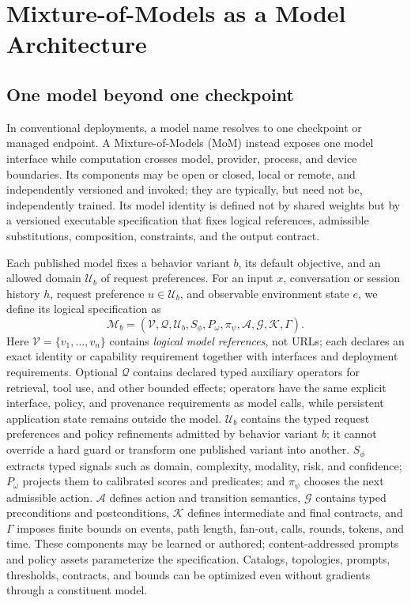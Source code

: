 \section{Mixture-of-Models as a Model Architecture}
\label{sec:formalism}

\subsection{One model beyond one checkpoint}

In conventional deployments, a model name resolves to one checkpoint or managed
endpoint. A Mixture-of-Models (MoM) instead exposes one model interface while
computation crosses model, provider, process, and device boundaries. Its
components may be open or closed, local or remote, and independently versioned
and invoked; they are typically, but need not be, independently trained.
Its model identity is defined not by shared weights but by a versioned
executable specification that fixes logical references, admissible
substitutions, composition, constraints, and the output contract.

Each published model fixes a behavior variant $b$, its default objective, and
an allowed domain $\mathcal{U}_b$ of request preferences. For an input $x$,
conversation or session history $h$, request preference $u\in\mathcal{U}_b$,
and observable environment state $e$, we define its logical specification as
\begin{equation}
  \mathcal{M}_b =
  (\mathcal{V}, \mathcal{Q}, \mathcal{U}_b, S_{\phi}, P_{\omega}, \pi_{\psi},
   \mathcal{A}, \mathcal{G}, \mathcal{K}, \Gamma).
  \label{eq:mom-object}
\end{equation}
Here $\mathcal{V}=\{v_1,\ldots,v_n\}$ contains \emph{logical model references},
not URLs; each declares an exact identity or capability requirement together
with interfaces and deployment requirements. Optional $\mathcal{Q}$ contains
declared typed auxiliary operators for retrieval, tool use, and other bounded
effects; operators have the same explicit interface, policy, and provenance
requirements as model calls, while persistent application state remains
outside the model. $\mathcal{U}_b$ contains the typed request preferences and
policy refinements admitted by behavior variant $b$; it cannot override a hard
guard or transform one published variant into another.
$S_{\phi}$ extracts typed signals such as domain, complexity, modality, risk,
and confidence; $P_{\omega}$ projects them to calibrated scores and predicates;
and $\pi_{\psi}$ chooses the next admissible action. $\mathcal{A}$ defines
action and transition semantics, $\mathcal{G}$ contains typed preconditions and
postconditions, $\mathcal{K}$ defines intermediate and final contracts, and
$\Gamma$ imposes finite bounds on events, path length, fan-out, calls, rounds,
tokens, and time. These components may be learned or authored; content-addressed
prompts and policy assets parameterize the specification. Catalogs, topologies,
prompts, thresholds, contracts, and bounds can be optimized even without
gradients through a constituent model.

